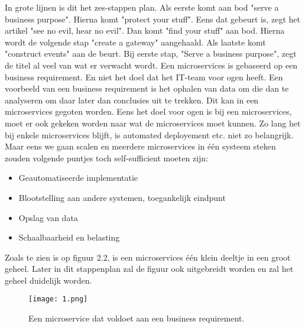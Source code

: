 In grote lijnen is dit het zes-stappen plan. Als eerste komt aan bod "serve a business purpose". Hierna komt "protect your stuff". Eens dat gebeurt is, zegt het artikel "see no evil, hear no evil". Dan komt "find your stuff" aan bod. Hierna wordt de volgende stap "create a gateway" aangehaald. Als laatste komt "construct events" aan de beurt. 
Bij eerste stap, "Serve a business purpose", zegt de titel al veel van wat er verwacht wordt. Een microservices is gebaseerd op een business requirement. En niet het doel dat het IT-team voor ogen heeft. Een voorbeeld van een business requirement is het ophalen van data om die dan te analyseren om daar later dan conclusies uit te trekken. Dit kan in een microservices gegoten worden. Eens het doel voor ogen is bij een microservices, moet er ook gekeken worden naar wat de microservices moet kunnen. Zo lang het bij enkele microservices blijft, is automated deployement etc. niet zo belangrijk. Maar eens we gaan scalen en meerdere microservices in één systeem steken zouden volgende puntjes toch self-sufficient moeten zijn:
\begin{itemize}
	\item Geautomatiseerde implementatie
	\item Blootstelling aan andere systemen, toegankelijk eindpunt
	\item Opslag van data
	\item Schaalbaarheid en belasting
\end{itemize}
Zoals te zien is op figuur 2.2, is een microservices één klein deeltje in een groot geheel. Later in dit stappenplan zal de figuur ook uitgebreidt worden en zal het geheel duidelijk worden. 
\begin{figure}[h]
	\texttt{[image: 1.png]}
	\caption{Een microservice dat voldoet aan een business requirement. \textcite{Benetis2016}}
	\centering
\end{figure}

